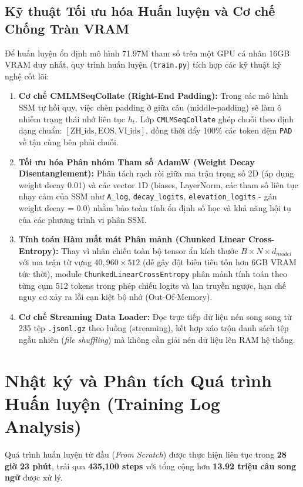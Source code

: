 \documentclass{uetgraduation}
\begin{document}
\subsection{Kỹ thuật Tối ưu hóa Huấn luyện và Cơ chế Chống Tràn VRAM}
Để huấn luyện ổn định mô hình 71.97M tham số trên một GPU cá nhân 16GB VRAM duy nhất, quy trình huấn luyện (\texttt{train.py}) tích hợp các kỹ thuật kỹ nghệ cốt lõi:
\begin{enumerate}
    \item \textbf{Cơ chế CMLMSeqCollate (Right-End Padding):} Trong các mô hình SSM tự hồi quy, việc chèn padding ở giữa câu (middle-padding) sẽ làm ô nhiễm trạng thái nhớ liên tục $h_t$. Lớp \texttt{CMLMSeqCollate} ghép chuỗi theo định dạng chuẩn: $[\text{ZH\_ids}, \text{EOS}, \text{VI\_ids}]$, đồng thời đẩy 100\% các token đệm \texttt{PAD} về tận cùng bên phải chuỗi.
    \item \textbf{Tối ưu hóa Phân nhóm Tham số AdamW (Weight Decay Disentanglement):} Phân tách rạch ròi giữa ma trận trọng số 2D (áp dụng weight decay 0.01) và các vector 1D (biases, LayerNorm, các tham số liên tục nhạy cảm của SSM như \texttt{A\_log}, \texttt{decay\_logits}, \texttt{elevation\_logits} - gán weight decay = 0.0) nhằm bảo toàn tính ổn định số học và khả năng hội tụ của các phương trình vi phân SSM.
    \item \textbf{Tính toán Hàm mất mát Phân mảnh (Chunked Linear Cross-Entropy):} Thay vì nhân chiếu toàn bộ tensor ẩn kích thước $B \times N \times d_{model}$ với ma trận từ vựng $40,960 \times 512$ (dễ gây đột biến tiêu tốn hơn 6GB VRAM tức thời), module \texttt{ChunkedLinearCrossEntropy} phân mảnh tính toán theo từng cụm 512 tokens trong phép chiếu logits và lan truyền ngược, hạn chế nguy cơ xảy ra lỗi cạn kiệt bộ nhớ (Out-Of-Memory).
    \item \textbf{Cơ chế Streaming Data Loader:} Đọc trực tiếp dữ liệu nén song song từ 235 tệp \texttt{.jsonl.gz} theo luồng (streaming), kết hợp xáo trộn danh sách tệp ngẫu nhiên (\textit{file shuffling}) mà không cần giải nén dữ liệu lên RAM hệ thống.
\end{enumerate}

\section{Nhật ký và Phân tích Quá trình Huấn luyện (Training Log Analysis)}
Quá trình huấn luyện từ đầu (\textit{From Scratch}) được thực hiện liên tục trong \textbf{28 giờ 23 phút}, trải qua \textbf{435,100 steps} với tổng cộng hơn \textbf{13.92 triệu câu song ngữ} được xử lý.
\end{document}
